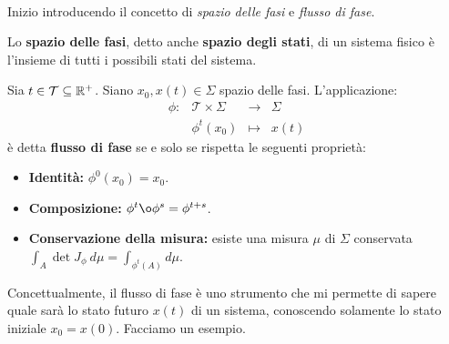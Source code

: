 \paragraph {}
Inizio introducendo il concetto di \emph{spazio delle fasi} e \emph{flusso di fase}.

\begin{definition}
    Lo \textbf{spazio delle fasi}, detto anche \textbf{spazio degli stati}, di
    un sistema fisico è l'insieme di tutti i possibili stati del sistema.
\end{definition}

\begin{definition}
    Sia $t \in \mathcal T \subseteq \mathbb{R}^+$. Siano $x_0, x(t) \in \Sigma$ spazio delle fasi.
    L'applicazione: \\
    \begin{equation*}
        \begin{array}{cccc}%
            \phi: &\mathcal T \times \Sigma &\to &\Sigma \\
            &\phi^t(x_0) &\mapsto &x(t)
        \end{array}%
    \end{equation*}
    è detta \textbf{flusso di fase} se e solo se rispetta le seguenti proprietà:
    \begin{itemize}
        \item \textbf{Identità:} $\phi^0(x_0) = x_0$.
        \item \textbf{Composizione:} $\phi^t \o \phi^s = \phi^{t+s}$.
        \item \textbf{Conservazione della misura:} esiste una misura $\mu$ di $\Sigma$ %
        conservata $\int_A \det J_\phi \ d\mu = \int_{\phi^t(A)} d\mu$.
    \end{itemize}
\end{definition}

Concettualmente, il flusso di fase è uno strumento che mi permette di sapere
quale sarà lo stato futuro $x(t)$ di un sistema, conoscendo solamente lo stato
iniziale $x_0 = x(0)$.
Facciamo un esempio.

